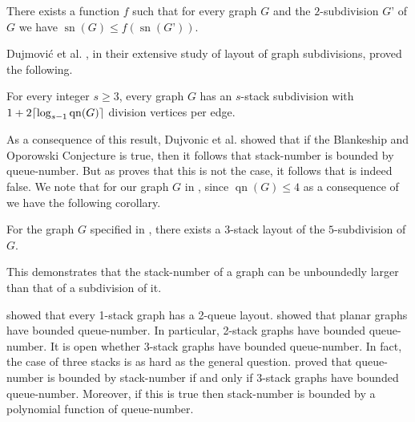 \documentclass[kpfonts]{patmorin}
\DeclareMathOperator{\sn}{sn}
\DeclareMathOperator{\qn}{qn}
\renewcommand{\leq}{\leqslant}
\renewcommand{\geq}{\geqslant}
\begin{document}
\begin{conj}\label{B_conj}\citep{BO99,BO01}
	There exists a function $f$ such that for every graph $G$ and the $2$-subdivision $G’$ of $G$ we have $\sn(G) \leq f(\sn(G’))$. 
\end{conj} 

Dujmovi\'c et al. \cite{DujWoo05}, in their extensive study of layout of graph subdivisions, proved the following.

\begin{thm}\label{sub_thm} \cite{DujWoo05}
	For every integer $s \geq 3$, every graph $G$ has an $s$-stack subdivision with $1+2 \ceil{\log_{s-1}\qn(G)}$ division vertices per edge.
\end{thm}


As a consequence of this result, Dujvonic et al. showed that if the Blankeship and Oporowski Conjecture is true, then it follows that stack-number is bounded by queue-number. But as  proves that this is not the case, it follows that  is indeed false. We note that for our graph $G$ in , since $\qn(G) \leq 4$ as a consequence of  we have the following corollary.

\begin{cor}
	For the graph $G$ specified in , there exists a $3$-stack layout of the $5$-subdivision of $G$.
\end{cor}

This demonstrates that the stack-number of a graph can be unboundedly larger than that of a subdivision of it.


%
%
%
%
%



\citet{HLR92} showed that every 1-stack graph has a 2-queue layout. \citet{DJMMUW20} showed that planar graphs have bounded queue-number. In particular, 2-stack graphs have bounded queue-number. It is open whether 3-stack graphs have bounded queue-number. In fact, the case of three stacks is as hard as the general question. \citet{DujWoo05} proved that queue-number is bounded by stack-number if and only if 3-stack graphs have bounded queue-number. Moreover, if this is true then stack-number is bounded by a polynomial function of queue-number.




\end{document}
